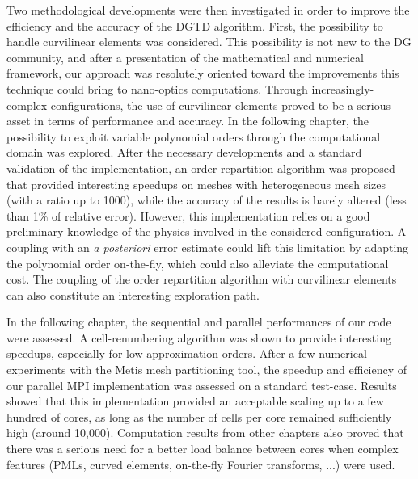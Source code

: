 Two methodological developments were then investigated in order to improve the efficiency and the accuracy of the DGTD algorithm. First, the possibility to handle curvilinear elements was considered. This possibility is not new to the DG community, and after a presentation of the mathematical and numerical framework, our approach was resolutely oriented toward the improvements this technique could bring to nano-optics computations. Through increasingly-complex configurations, the use of curvilinear elements proved to be a serious asset in terms of performance and accuracy. In the following chapter, the possibility to exploit variable polynomial orders through the computational domain was explored. After the necessary developments and a standard validation of the implementation, an order repartition algorithm was proposed that provided interesting speedups on meshes with heterogeneous mesh sizes (with a ratio up to 1000), while the accuracy of the results is barely altered (less than 1\% of relative error). However, this implementation relies on a good preliminary knowledge of the physics involved in the considered configuration. A coupling with an \textit{a posteriori} error estimate could lift this limitation by adapting the polynomial order on-the-fly, which could also alleviate the computational cost. The coupling of the order repartition algorithm with curvilinear elements can also constitute an interesting exploration path.

In the following chapter, the sequential and parallel performances of our code were assessed. A cell-renumbering algorithm was shown to provide interesting speedups, especially for low approximation orders. After a few numerical experiments with the Metis mesh partitioning tool, the speedup and efficiency of our parallel MPI implementation was assessed on a standard test-case. Results showed that this implementation provided an acceptable scaling up to a few hundred of cores, as long as the number of cells per core remained sufficiently high (around 10,000). Computation results from other chapters also proved that there was a serious need for a better load balance between cores when complex features (PMLs, curved elements, on-the-fly Fourier transforms, ...) were used.

